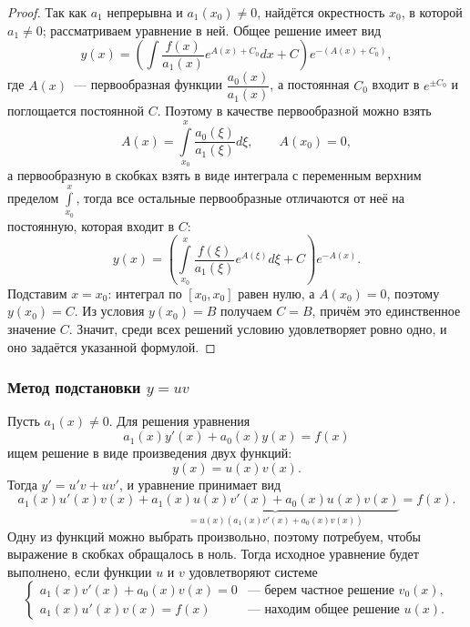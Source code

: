 \documentclass[12pt]{article}
\begin{document}
    \begin{proof}
    	Так как $a_1$ непрерывна и $a_1(x_0) \ne 0$, найдётся окрестность $x_0$, в которой $a_1 \ne 0$; рассматриваем уравнение в ней. Общее решение имеет вид
    	\[
    		y(x) = \left( \int \dfrac{f(x)}{a_1(x)} e^{A(x) + C_0} dx + C \right) e^{-(A(x) + C_0)},
    	\]
    	где $A(x)$~--- первообразная функции $\dfrac{a_0(x)}{a_1(x)}$, а постоянная $C_0$ входит в $e^{\pm C_0}$ и поглощается постоянной $C$. Поэтому в качестве первообразной можно взять
    	\[
    		A(x) = \int\limits_{x_0}^{x} \dfrac{a_0(\xi)}{a_1(\xi)} d\xi, \qquad A(x_0) = 0,
    	\]
    	а первообразную в скобках взять в виде интеграла с переменным верхним пределом $\int\limits_{x_0}^{x}$, тогда все остальные первообразные отличаются от неё на постоянную, которая входит в $C$:
    	\[
    		y(x) = \left( \int\limits_{x_0}^{x} \dfrac{f(\xi)}{a_1(\xi)} e^{A(\xi)} d\xi + C \right) e^{-A(x)}.
    	\]
    	Подставим $x = x_0$: интеграл по $[x_0, x_0]$ равен нулю, а $A(x_0) = 0$, поэтому $y(x_0) = C$. Из условия $y(x_0) = B$ получаем $C = B$, причём это единственное значение $C$. Значит, среди всех решений условию удовлетворяет ровно одно, и оно задаётся указанной формулой.
    \end{proof}
    
    \subsubsection{Метод подстановки $y = uv$}
    
    \begin{method}[Решение линейного уравнения подстановкой $y = uv$]
    	Пусть $a_1(x) \ne 0$. Для решения уравнения
    	\[
    		a_1(x) y'(x) + a_0(x) y(x) = f(x)
    	\]
    	ищем решение в виде произведения двух функций:
    	\[
    		y(x) = u(x) v(x).
    	\]
    	Тогда $y' = u'v + uv'$, и уравнение принимает вид
    	\[
    		a_1(x) u'(x) v(x) + \underbrace{a_1(x) u(x) v'(x) + a_0(x) u(x) v(x)}_{= u(x) \left( a_1(x) v'(x) + a_0(x) v(x) \right)} = f(x).
    	\]
    	Одну из функций можно выбрать произвольно, поэтому потребуем, чтобы выражение в скобках обращалось в ноль. Тогда исходное уравнение будет выполнено, если функции $u$ и $v$ удовлетворяют системе
    	\[
    		\begin{cases}
    			a_1(x) v'(x) + a_0(x) v(x) = 0 & \text{--- берем частное решение } v_0(x), \\
    			a_1(x) u'(x) v(x) = f(x) & \text{--- находим общее решение } u(x).
    		\end{cases}
    	\]
    \end{method}
    
\end{document}
